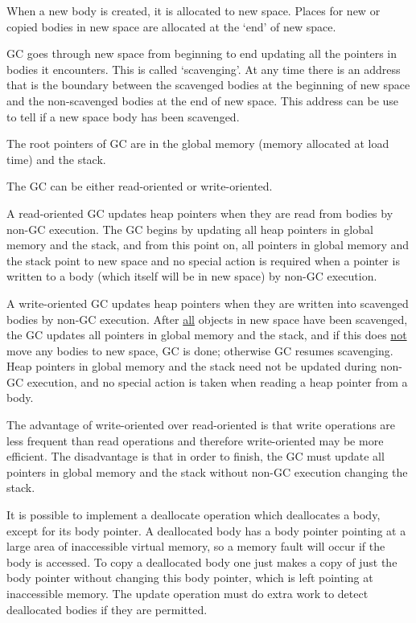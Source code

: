 \documentclass[12pt]{article}
\begin{document}
When a new body is created, it is allocated to new space.
Places for new or copied bodies in new space are
allocated at the `end' of new space.

GC goes through new space from beginning to end updating
all the pointers in bodies it encounters.  This is called
`scavenging'.  At any time there is an address that is the
boundary between the scavenged bodies at the beginning
of new space and the non-scavenged bodies at the end of
new space.  This address can be use to tell if a new space
body has been scavenged.

The root pointers of GC are in the global memory (memory
allocated at load time) and the stack.

The GC can be either read-oriented or write-oriented.

A read-oriented GC updates heap pointers when they are read
from bodies by non-GC execution.
The GC begins by updating all heap pointers in global memory
and the stack, and from this point on, all pointers in global
memory and the stack
point to new space and no special action is required when
a pointer is written to a body (which itself will be in new
space) by non-GC execution.

A write-oriented GC updates heap pointers when they are
written into scavenged bodies by non-GC execution. 
After \underline{all} objects in new space have been scavenged,
the GC updates all pointers in global memory and the stack,
and if this does \underline{not}
move any bodies to new space, GC is done; otherwise
GC resumes scavenging.  Heap pointers in global memory and the stack need
not be updated during non-GC execution, and no special action is taken
when reading a heap pointer from a body.

The advantage of write-oriented over read-oriented is
that write operations are less frequent than read
operations and therefore write-oriented may be more
efficient.  The disadvantage is that in order to finish, the GC
must update all pointers in global memory and
the stack without non-GC execution changing the stack.

It is possible to implement a deallocate operation
which deallocates a body, except for its body pointer.
A deallocated body has a body pointer pointing at
a large area of inaccessible virtual memory, so a
memory fault will occur if the body is accessed.
To copy a deallocated body one just makes a copy
of just the body pointer without changing this body pointer,
which is left pointing at inaccessible memory.
The update operation must do extra work to detect
deallocated bodies if they are permitted.
\end{document}

